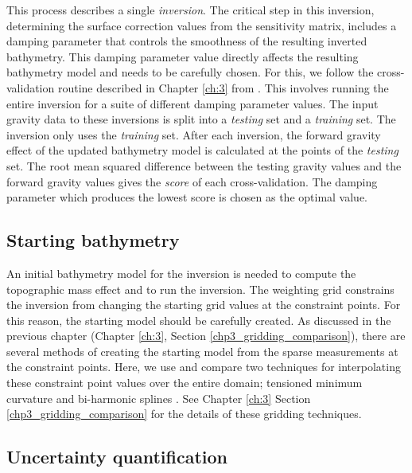 This process describes a single \textit{inversion}. The critical step in this inversion, determining the surface correction values from the sensitivity matrix, includes a damping parameter that controls the smoothness of the resulting inverted bathymetry. This damping parameter value directly affects the resulting bathymetry model and needs to be carefully chosen. For this, we follow the cross-validation routine described in Chapter \ref{ch:3} from \citet{uiedafast2017}. This involves running the entire inversion for a suite of different damping parameter values. The input gravity data to these inversions is split into a \textit{testing} set and a \textit{training} set. The inversion only uses the \textit{training} set. After each inversion, the forward gravity effect of the updated bathymetry model is calculated at the points of the \textit{testing} set. The root mean squared difference between the testing gravity values and the forward gravity values gives the \textit{score} of each cross-validation. The damping parameter which produces the lowest score is chosen as the optimal value.\\


\subsection{Starting bathymetry} \label{chp4_starting_bed_method}

An initial bathymetry model for the inversion is needed to compute the topographic mass effect and to run the inversion. The weighting grid constrains the inversion from changing the starting grid values at the constraint points. For this reason, the starting model should be carefully created. As discussed in the previous chapter (Chapter \ref{ch:3}, Section \ref{chp3_gridding_comparison}), there are several methods of creating the starting model from the sparse measurements at the constraint points. Here, we use and compare two techniques for interpolating these constraint point values over the entire domain; tensioned minimum curvature \citep{smithgridding1990} and bi-harmonic splines \citep{sandwellbiharmonic1987}. See Chapter \ref{ch:3} Section \ref{chp3_gridding_comparison} for the details of these gridding techniques.\\

\subsection{Uncertainty quantification} \label{chp4_uncertainty_method}

